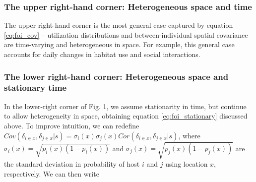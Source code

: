 \documentclass[letterpaper]{article}
\begin{document}
\subsubsection*{The upper right-hand corner: Heterogeneous space and time}

The upper right-hand corner is the most general case captured by equation \ref{eq:foi_cov} -- utilization distributions and between-individual spatial covariance are time-varying and heterogeneous in space.  For example, this general case accounts for daily changes in habitat use and social interactions. 

\subsubsection*{The lower right-hand corner: Heterogeneous space and stationary time}

In the lower-right corner of Fig. 1, we assume stationarity in time, but continue to allow heterogeneity in space, obtaining equation \ref{eq:foi_stationary} discussed above.  To improve intuition, we can redefine $Cov(\delta_{i \in x}, \delta_{j \in x} | s) = \sigma_i(x) \sigma_j(x) Cor(\delta_{i \in x}, \delta_{j \in x} | s)$, where $\sigma_i(x) = \sqrt{p_i(x)(1 - p_i(x))}$  and $\sigma_j(x) = \sqrt{p_j(x)(1 - p_j(x))}$ are the standard deviation in probability of host $i$ and $j$ using location $x$, respectively.  We can then write
\end{document}
